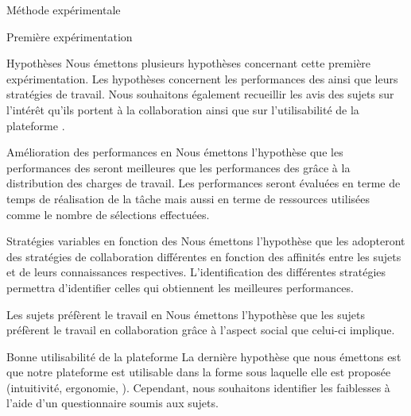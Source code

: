 \documentclass[myfrancais,ngerman,english,frenchb]{mythesis}
\begin{document}
	\begin{mychapter}{Méthode expérimentale}
		\begin{mysection}{Première expérimentation}
			\begin{mysubsection}{Hypothèses}
				Nous émettons plusieurs hypothèses concernant cette première expérimentation.
				Les hypothèses concernent les performances des  ainsi que leurs stratégies de travail.
				Nous souhaitons également recueillir les avis des sujets sur l'intérêt qu'ils portent à la collaboration ainsi que sur l'utilisabilité de la plateforme \myShaddock.
				\begin{myparagraph}{ Amélioration des performances en }
					Nous émettons l'hypothèse que les performances des  seront meilleures que les performances des  grâce à la distribution des charges de travail.
					Les performances seront évaluées en terme de temps de réalisation de la tâche mais aussi en terme de ressources utilisées comme le nombre de sélections effectuées.
				\end{myparagraph}
				\begin{myparagraph}{ Stratégies variables en fonction des }
					Nous émettons l'hypothèse que les  adopteront des stratégies de collaboration différentes en fonction des affinités entre les sujets et de leurs connaissances respectives.
					L'identification des différentes stratégies permettra d'identifier celles qui obtiennent les meilleures performances.
				\end{myparagraph}
				\begin{myparagraph}{ Les sujets préfèrent le travail en }
					Nous émettons l'hypothèse que les sujets préfèrent le travail en collaboration grâce à l'aspect social que celui-ci implique.
				\end{myparagraph}
				\begin{myparagraph}{ Bonne utilisabilité de la plateforme}
					La dernière hypothèse que nous émettons est que notre plateforme est utilisable dans la forme sous laquelle elle est proposée (intuitivité, ergonomie, \myetc).
					Cependant, nous souhaitons identifier les faiblesses à l'aide d'un questionnaire soumis aux sujets.

\end{myparagraph}
\end{mysubsection}
\end{mysection}
\end{mychapter}
\end{document}

